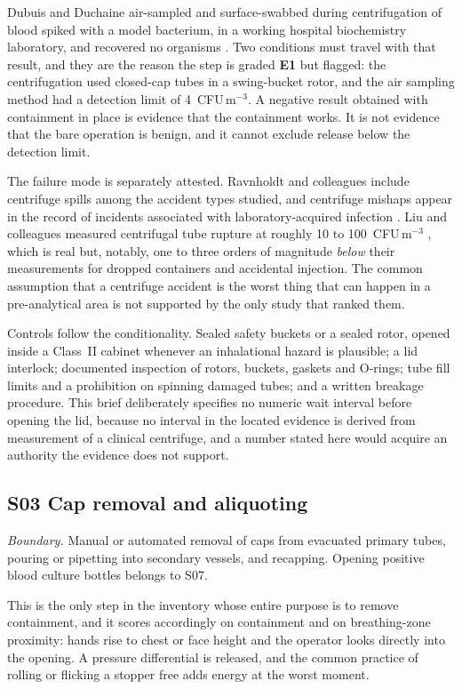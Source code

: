 Dubuis and Duchaine air-sampled and surface-swabbed during centrifugation of
blood spiked with a model bacterium, in a working hospital biochemistry
laboratory, and recovered no organisms \cite{dubuis2021}. Two conditions must
travel with that result, and they are the reason the step is graded \textbf{E1}
but flagged: the centrifugation used closed-cap tubes in a swing-bucket rotor,
and the air sampling method had a detection limit of 4~CFU\,m$^{-3}$. A
negative result obtained with containment in place is evidence that the
containment works. It is not evidence that the bare operation is benign, and it
cannot exclude release below the detection limit.

The failure mode is separately attested. Ravnholdt and colleagues include
centrifuge spills among the accident types studied, and centrifuge mishaps
appear in the record of incidents associated with laboratory-acquired infection
\cite{ravnholdt2025}. Liu and colleagues measured centrifugal tube rupture at
roughly 10 to 100~CFU\,m$^{-3}$ \cite{liu2023}, which is real but, notably,
one to three orders of magnitude \textit{below} their measurements for dropped
containers and accidental injection. The common assumption that a centrifuge
accident is the worst thing that can happen in a pre-analytical area is not
supported by the only study that ranked them.

Controls follow the conditionality. Sealed safety buckets or a sealed rotor,
opened inside a Class~II cabinet whenever an inhalational hazard is plausible;
a lid interlock; documented inspection of rotors, buckets, gaskets and
O-rings; tube fill limits and a prohibition on spinning damaged tubes; and a
written breakage procedure. This brief deliberately specifies no numeric wait
interval before opening the lid, because no interval in the located evidence is
derived from measurement of a clinical centrifuge, and a number stated here
would acquire an authority the evidence does not support.

\subsection{S03 Cap removal and aliquoting}

\textit{Boundary.} Manual or automated removal of caps from evacuated primary
tubes, pouring or pipetting into secondary vessels, and recapping. Opening
positive blood culture bottles belongs to S07.

This is the only step in the inventory whose entire purpose is to remove
containment, and it scores accordingly on containment and on breathing-zone
proximity: hands rise to chest or face height and the operator looks directly
into the opening. A pressure differential is released, and the common practice
of rolling or flicking a stopper free adds energy at the worst moment.

